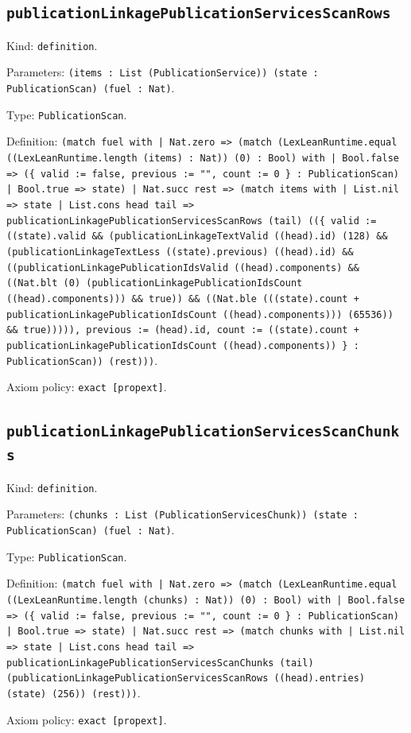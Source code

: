 \documentclass[11pt]{article}
\begin{document}
\subsection*{\texttt{publicationLinkagePublicationServicesScanRows}}
\noindent Kind: \texttt{definition}.\par
\noindent Parameters: \texttt{(items : List (PublicationService)) (state : PublicationScan) (fuel : Nat)}.\par
\noindent Type: \texttt{PublicationScan}.\par
\noindent Definition: \texttt{(match fuel with | Nat.zero => (match (LexLeanRuntime.equal ((LexLeanRuntime.length (items) : Nat)) (0) : Bool) with | Bool.false => (\{ valid := false, previous := "", count := 0 \} : PublicationScan) | Bool.true => state) | Nat.succ rest => (match items with | List.nil => state | List.cons head tail => publicationLinkagePublicationServicesScanRows (tail) ((\{ valid := ((state).valid \&\& (publicationLinkageTextValid ((head).id) (128) \&\& (publicationLinkageTextLess ((state).previous) ((head).id) \&\& ((publicationLinkagePublicationIdsValid ((head).components) \&\& ((Nat.blt (0) (publicationLinkagePublicationIdsCount ((head).components))) \&\& true)) \&\& ((Nat.ble (((state).count + publicationLinkagePublicationIdsCount ((head).components))) (65536)) \&\& true))))), previous := (head).id, count := ((state).count + publicationLinkagePublicationIdsCount ((head).components)) \} : PublicationScan)) (rest)))}.\par
\noindent Axiom policy: \texttt{exact [propext]}.\par
\subsection*{\texttt{publicationLinkagePublicationServicesScanChunks}}
\noindent Kind: \texttt{definition}.\par
\noindent Parameters: \texttt{(chunks : List (PublicationServicesChunk)) (state : PublicationScan) (fuel : Nat)}.\par
\noindent Type: \texttt{PublicationScan}.\par
\noindent Definition: \texttt{(match fuel with | Nat.zero => (match (LexLeanRuntime.equal ((LexLeanRuntime.length (chunks) : Nat)) (0) : Bool) with | Bool.false => (\{ valid := false, previous := "", count := 0 \} : PublicationScan) | Bool.true => state) | Nat.succ rest => (match chunks with | List.nil => state | List.cons head tail => publicationLinkagePublicationServicesScanChunks (tail) (publicationLinkagePublicationServicesScanRows ((head).entries) (state) (256)) (rest)))}.\par
\noindent Axiom policy: \texttt{exact [propext]}.\par
\end{document}
